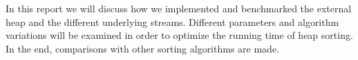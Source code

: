 In this report we will discuss how we implemented and benchmarked the external heap and the different underlying streams. Different parameters and algorithm variations will be examined in order to optimize the running time of heap sorting. In the end, comparisons with other sorting algorithms are made.